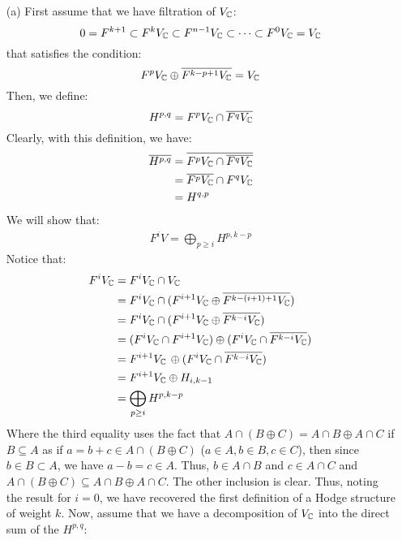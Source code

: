 \documentclass[12pt]{article}
\begin{document}
\begin{solution}
    \bbni
    \begin{enumerate}
        \item[(a)] First assume that we have filtration of $V_\mathbb C$:
        \[ 0 = F^{k+1} \subset F^k V_\mathbb C \subset F^{n-1} V_\mathbb C \subset \cdots \subset F^0 V_\mathbb C = V_\mathbb C\]
        that satisfies the condition: 
        \[ F^p V_\mathbb C \oplus \overline{F^{k-p+1} V_\mathbb C } = V_\mathbb C\]
        Then, we define: 
        \[ H^{p, q} = F^p V_\mathbb C \cap \overline{F^q V_\mathbb C}  \]
        Clearly, with this definition, we have: 
        \begin{align*}
            \overline{H^{p, q}} &= \overline{F^p V_\mathbb C \cap \overline{F^q V_\mathbb C}} \\
            &= \overline{F^p V_\mathbb C} \cap F^q V_\mathbb C \\
            &= H^{q, p}
        \end{align*}
        We will show that: 
        \begin{align*}
            F^{i} V  = \bigoplus_{p \geq i} H^{p, k-p}
        \end{align*}
        Notice that: 
        \begin{align*}
            F^{i} V_\mathbb C &= F^{i} V_\mathbb C \cap V_\mathbb C \\
            &= F^{i} V_\mathbb C \cap (F^{i+1} V_\mathbb C \oplus \overline{F^{k-(i+1)+1} V_\mathbb C }) \\
            &= F^{i} V_\mathbb C \cap (F^{i+1} V_\mathbb C \oplus \overline{F^{k-i} V_\mathbb C }) \\
            &= (F^{i} V_\mathbb C \cap F^{i+1} V_\mathbb C)  \oplus (F^{i} V_\mathbb C \cap \overline{F^{k-i} V_\mathbb C}) \\
            &= F^{i+1} V_\mathbb C  \, \oplus (F^{i} V_\mathbb C \cap \overline{F^{k-i} V_\mathbb C }) \\ 
            &= F^{i+1} V_\mathbb C \oplus H_{i, k-1} \\
            &= \bigoplus_{p \geq i} H^{p, k-p}
        \end{align*}
        Where the third equality uses the fact that $A \cap (B \oplus C) = A \cap B \oplus A \cap C$ if $B \subseteq A$ as if $a = b + c \in A \cap (B \oplus C)$ ($a \in A, b \in B, c \in C$), then since $b \in B \subset A$, we have $a-b = c \in A$. Thus, $b \in A \cap B$ and $c \in A \cap C$ and $A \cap (B \oplus C) \subseteq A \cap B \oplus A \cap C$. The other inclusion is clear. \bbni 
        Thus, noting the result for $i = 0$, we have recovered the first definition of a Hodge structure of weight $k$. \bbni
        Now, assume that we have a decomposition of $V_\mathbb C$ into the direct sum of the $H^{p, q}$:

\end{enumerate}
\end{solution}
\end{document}
